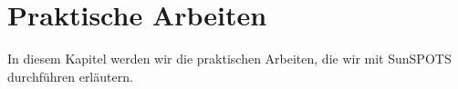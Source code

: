 \chapter{Praktische Arbeiten}\label{c:PraktischeArbeiten}

In diesem Kapitel werden wir die praktischen Arbeiten, die wir mit SunSPOTS durchführen erläutern. 




